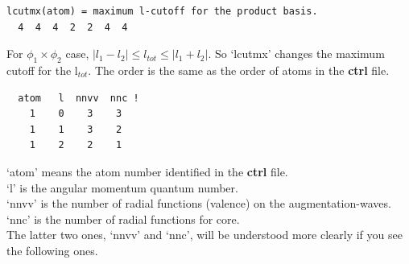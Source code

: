\documentclass[a4paper,10pt,epsf,fleqn]{article}
\begin{document}
{\begin{enumerate}
\begin{verbatim}
lcutmx(atom) = maximum l-cutoff for the product basis.
  4  4  4  2  2  4  4
\end{verbatim}
For $\phi_1 \times \phi_2$ case, $|l_1 - l_2| \le l_{tot} \le |l_1 + l_2|$. So `lcutmx' changes the maximum cutoff for the l$_{tot}$. The order is the same as the order of atoms in the {\bf ctrl} file.

\begin{verbatim}
  atom   l  nnvv  nnc !
    1    0    3    3
    1    1    3    2
    1    2    2    1
\end{verbatim}
`atom' means the atom number identified in the {\bf ctrl} file.\\ 
`l' is the angular momentum quantum number.\\
`nnvv' is the number of radial functions (valence) on the augmentation-waves.\\
`nnc' is the number of radial functions for core.\\
The latter two ones, `nnvv' and `nnc', will be understood more clearly if you see the following ones.



\end{enumerate}}
\end{document}
